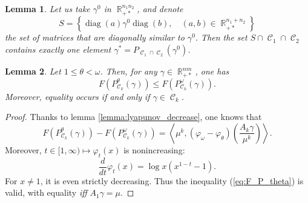\documentclass{article} %
\newcommand{\scal}[2]{\left\langle #1 , #2 \right\rangle}
\DeclareMathOperator{\IR}{\mathbb{R}}
\DeclareMathOperator{\Ccal}{\mathcal{C}}
\DeclareMathOperator{\diag}{diag}
\theoremstyle{plain}
\newtheorem{lemma}{Lemma}
\theoremstyle{definition}
\theoremstyle{remark}
\begin{document}
\begin{lemma}
	\label{lemma:trivial_intersection}
	Let us take $\gamma^0$ in $\IR_{+*}^{n_1 n_2}$,
	and denote
	\[
	S = \left\{
	\diag(a) \gamma^0 \diag(b),\quad
	(a,b) \in \IR_{+*}^{n_1 + n_2}
	\right\}
	\]
	the set of matrices that are diagonally similar to $\gamma^0$.
	Then the set $S \cap \Ccal_1 \cap \Ccal_2$ contains exactly one element $\gamma^* = P_{\Ccal_1 \cap \Ccal_2}(\gamma^0)$.
\end{lemma}

\begin{lemma}\label{lemma:F_P_theta}
	Let $1\le \theta < \omega$. Then, for any $\gamma \in \IR_{+*}^{nm}$, one has
	\begin{equation}\label{eq:F_P_theta}
	F(P^\theta_{\Ccal_k}(\gamma)) \le F(P^\omega_{\Ccal_k}(\gamma)).
	\end{equation}
	Moreover, equality occurs if and only if $\gamma \in \Ccal_k$.
\end{lemma}
\begin{proof}
	Thanks to lemma \ref{lemma:lyapunov_decrease}, one knows that
	\[
	F(P^\theta_{\Ccal_k}(\gamma)) - F(P^\omega_{\Ccal_k}(\gamma))
	= \scal{\mu^k}{(\varphi_\omega - \varphi_\theta) \left( \frac{A_k \gamma}{\mu^k} \right) } .
	\]
	Moreover, $t \in [1,\infty) \mapsto \varphi_t(x)$ is nonincreasing:
	\[
	\frac{d}{dt} \varphi_t(x) = \log x (x^{1-t} - 1).
	\]
	For $x\neq 1$, it is even strictly decreasing.
	Thus the inequality (\ref{eq:F_P_theta}) is valid, with equality \emph{iff} $A_1 \gamma = \mu$.
\end{proof}
\end{document}
